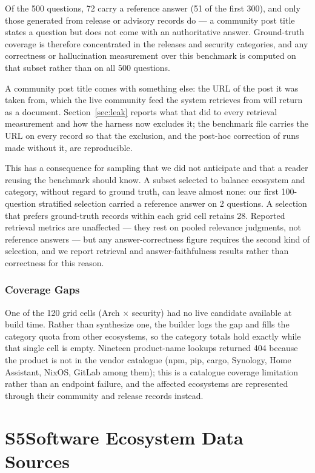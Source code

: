 \documentclass[acmsmall,anonymous,screen]{acmart}
\begin{document}
Of the 500 questions, 72 carry a reference answer (51 of the first 300), and
only those generated from release or advisory records do --- a community post
title states a question but does not come with an authoritative answer.
Ground-truth coverage is therefore concentrated in the releases and security
categories, and any correctness or hallucination measurement over this
benchmark is computed on that subset rather than on all 500 questions.

A community post title comes with something else: the URL of the post it was
taken from, which the live community feed the system retrieves from will return
as a document. Section~\ref{sec:leak} reports what that did to every retrieval
measurement and how the harness now excludes it; the benchmark file carries the
URL on every record so that the exclusion, and the post-hoc correction of runs
made without it, are reproducible.

This has a consequence for sampling that we did not anticipate and that a
reader reusing the benchmark should know. A subset selected to balance ecosystem
and category, without regard to ground truth, can leave almost none: our first
100-question stratified selection carried a reference answer on 2 questions. A
selection that prefers ground-truth records within each grid cell retains 28.
Reported retrieval metrics are unaffected --- they rest on pooled relevance
judgments, not reference answers --- but any answer-correctness figure requires
the second kind of selection, and we report retrieval and answer-faithfulness
results rather than correctness for this reason.

\subsubsection{Coverage Gaps}

One of the 120 grid cells (Arch $\times$ security) had no live candidate
available at build time. Rather than synthesize one, the builder logs the gap
and fills the category quota from other ecosystems, so the category totals hold
exactly while that single cell is empty. Nineteen product-name lookups returned
404 because the product is not in the vendor catalogue (npm, pip, cargo,
Synology, Home Assistant, NixOS, GitLab among them); this is a catalogue
coverage limitation rather than an endpoint failure, and the affected ecosystems
are represented through their community and release records instead.


\section*{S5\quad Software Ecosystem Data Sources}
\end{document}
